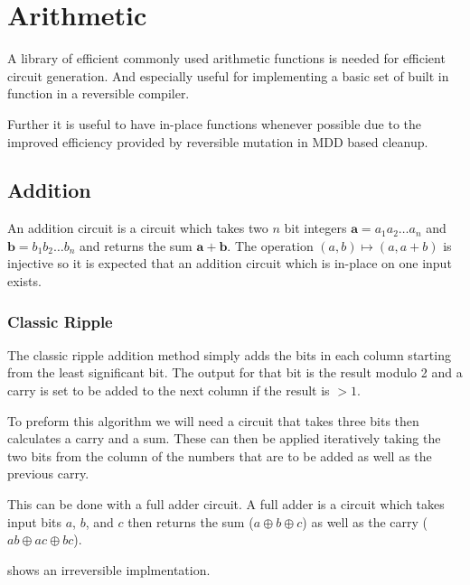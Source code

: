 \chapter{Arithmetic}

A library of efficient commonly used arithmetic functions is needed for
efficient circuit generation. And especially useful for implementing a basic set
of built in function in a reversible compiler.

Further it is useful to have in-place functions whenever possible due to the
improved efficiency provided by reversible mutation in MDD based cleanup.

\section{Addition}

  An addition circuit is a circuit which takes two $n$ bit integers $\mathbf{a} =
  a_1a_2\dotsc a_n$ and $\mathbf{b} = b_1b_2\dotsc b_n$ and returns the sum
  $\mathbf{a}+\mathbf{b}$. The operation $(a,b)\mapsto (a,a+b)$ is injective so
  it is expected that an addition circuit which is in-place on one input exists.

  \subsection{Classic Ripple}

    The classic ripple addition method simply adds the bits in each column
    starting from the least significant bit.  The output for that bit is the
    result modulo 2 and a carry is set to be added to the next column if the
    result is $>1$.

    To preform this algorithm we will need a circuit that takes three bits then
    calculates a carry and a sum.  These can then be applied iteratively taking
    the two bits from the column of the numbers that are to be added as well as
    the previous carry.

    This can be done with a full adder circuit.  A full adder is a circuit which
    takes input bits $a$, $b$, and $c$ then returns the sum ($a \oplus b \oplus
    c$) as well as the carry ($ab\oplus ac \oplus bc$).

     shows an irreversible implmentation.

